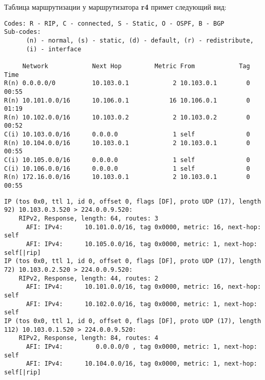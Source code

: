\documentclass[a4paper,12pt]{article}
\begin{document}
Таблица маршрутизации у маршрутизатора \textbf{r4} примет следующий вид:

\begin{Verbatim}
Codes: R - RIP, C - connected, S - Static, O - OSPF, B - BGP
Sub-codes:
      (n) - normal, (s) - static, (d) - default, (r) - redistribute,
      (i) - interface

     Network            Next Hop         Metric From            Tag Time
R(n) 0.0.0.0/0          10.103.0.1            2 10.103.0.1        0 00:55
R(n) 10.101.0.0/16      10.106.0.1           16 10.106.0.1        0 01:19
R(n) 10.102.0.0/16      10.103.0.2            2 10.103.0.2        0 00:52
C(i) 10.103.0.0/16      0.0.0.0               1 self              0
R(n) 10.104.0.0/16      10.103.0.1            2 10.103.0.1        0 00:55
C(i) 10.105.0.0/16      0.0.0.0               1 self              0
C(i) 10.106.0.0/16      0.0.0.0               1 self              0
R(n) 172.16.0.0/16      10.103.0.1            2 10.103.0.1        0 00:55
\end{Verbatim}

\begin{Verbatim}
IP (tos 0x0, ttl 1, id 0, offset 0, flags [DF], proto UDP (17), length 92) 10.103.0.3.520 > 224.0.0.9.520: 
	RIPv2, Response, length: 64, routes: 3
	  AFI: IPv4:      10.101.0.0/16, tag 0x0000, metric: 16, next-hop: self
	  AFI: IPv4:      10.105.0.0/16, tag 0x0000, metric: 1, next-hop: self[|rip]
IP (tos 0x0, ttl 1, id 0, offset 0, flags [DF], proto UDP (17), length 72) 10.103.0.2.520 > 224.0.0.9.520: 
	RIPv2, Response, length: 44, routes: 2
	  AFI: IPv4:      10.101.0.0/16, tag 0x0000, metric: 16, next-hop: self
	  AFI: IPv4:      10.102.0.0/16, tag 0x0000, metric: 1, next-hop: self
IP (tos 0x0, ttl 1, id 0, offset 0, flags [DF], proto UDP (17), length 112) 10.103.0.1.520 > 224.0.0.9.520: 
	RIPv2, Response, length: 84, routes: 4
	  AFI: IPv4:         0.0.0.0/0 , tag 0x0000, metric: 1, next-hop: self
	  AFI: IPv4:      10.104.0.0/16, tag 0x0000, metric: 1, next-hop: self[|rip]
\end{Verbatim}
\end{document}
